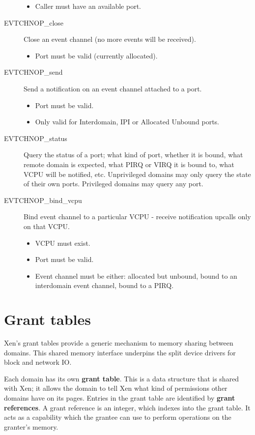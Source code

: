 \documentclass[11pt,twoside,final,openright]{report}
\begin{document}
\begin{description}
\begin{itemize}
  \item Caller must have an available port.
  \end{itemize}
\item[EVTCHNOP\_close]
  Close an event channel (no more events will be received).
  \begin{itemize}
  \item Port must be valid (currently allocated).
  \end{itemize}
\item[EVTCHNOP\_send] Send a notification on an event channel attached
  to a port.
  \begin{itemize}
  \item Port must be valid.
  \item Only valid for Interdomain, IPI or Allocated Unbound ports.
  \end{itemize}
\item[EVTCHNOP\_status] Query the status of a port; what kind of port,
  whether it is bound, what remote domain is expected, what PIRQ or
  VIRQ it is bound to, what VCPU will be notified, etc.
  Unprivileged domains may only query the state of their own ports.
  Privileged domains may query any port.
\item[EVTCHNOP\_bind\_vcpu] Bind event channel to a particular VCPU -
  receive notification upcalls only on that VCPU.
  \begin{itemize}
  \item VCPU must exist.
  \item Port must be valid.
  \item Event channel must be either: allocated but unbound, bound to
  an interdomain event channel, bound to a PIRQ.
  \end{itemize}

\end{description}


\chapter{Grant tables}
\label{c:granttables}

Xen's grant tables provide a generic mechanism to memory sharing
between domains.  This shared memory interface underpins the split
device drivers for block and network IO.

Each domain has its own {\bf grant table}.  This is a data structure
that is shared with Xen; it allows the domain to tell Xen what kind of
permissions other domains have on its pages.  Entries in the grant
table are identified by {\bf grant references}.  A grant reference is
an integer, which indexes into the grant table.  It acts as a
capability which the grantee can use to perform operations on the
granter's memory.
\end{document}

